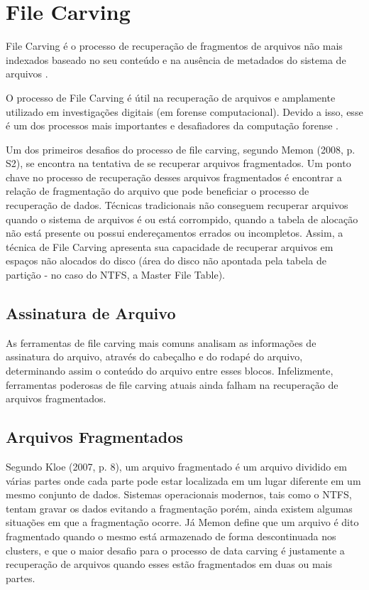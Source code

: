 \chapter{File Carving}
File Carving é o processo de recuperação de fragmentos de arquivos não mais indexados baseado no seu conteúdo e na ausência de metadados do sistema de arquivos \cite{BinCarver}. 

O processo de File Carving é útil na recuperação de arquivos e amplamente utilizado em investigações digitais (em forense computacional). Devido a isso, esse é um dos processos mais importantes e desafiadores da computação forense \cite{DGI}.

Um dos primeiros desafios do processo de file carving, segundo Memon (2008, p. S2), se encontra na tentativa de se recuperar arquivos fragmentados. Um ponto chave no processo de recuperação desses arquivos fragmentados é encontrar a relação de fragmentação do arquivo que pode beneficiar o processo de recuperação de dados. Técnicas tradicionais não conseguem recuperar arquivos quando o sistema de arquivos é ou está corrompido, quando a tabela de alocação não está presente ou possui endereçamentos errados ou incompletos. Assim, a técnica de File Carving apresenta sua capacidade de recuperar arquivos em espaços não alocados do disco (área do disco não apontada pela tabela de partição - no caso do NTFS, a Master File Table).

\section{Assinatura de Arquivo}
As ferramentas de file carving mais comuns analisam as informações de assinatura do arquivo, através do cabeçalho e do rodapé do arquivo, determinando assim o conteúdo do arquivo entre esses blocos. Infelizmente, ferramentas poderosas de file carving atuais ainda falham na recuperação de arquivos fragmentados.

\section{Arquivos Fragmentados}
Segundo Kloe (2007, p. 8), um arquivo fragmentado é um arquivo dividido em várias partes onde cada parte pode estar localizada em um lugar diferente em um mesmo conjunto de dados. Sistemas operacionais modernos, tais como o NTFS, tentam gravar os dados evitando a fragmentação porém, ainda existem algumas situações em que a fragmentação ocorre. Já Memon define que um arquivo é dito fragmentado quando o mesmo está armazenado de forma descontinuada nos clusters, e que o maior desafio para o processo de data carving é justamente a recuperação de arquivos quando esses estão fragmentados em duas ou mais partes. 

